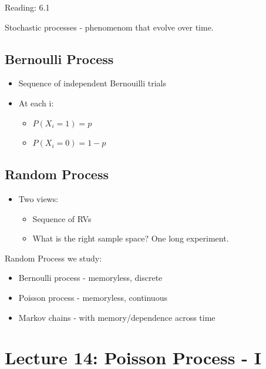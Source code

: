 \documentclass{article}
\begin{document}
 Reading: 6.1

Stochastic processes - phenomenom that evolve over time.


\subsection{Bernoulli Process}

\begin{itemize}
    \item Sequence of independent Bernouilli trials
    \item At each i:
    \begin{itemize}
        \item $P(X_i=1)=p$
        \item $P(X_i=0)=1-p$
    \end{itemize}
\end{itemize}

\subsection{Random Process}


\begin{itemize}
    \item Two views:
    \begin{itemize}
        \item Sequence of RVs
        \item What is the right sample space?  One long experiment.
    \end{itemize}
\end{itemize}


Random Process we study:
\begin{itemize}
    \item Bernoulli process - memoryless, discrete
    \item Poisson process - memoryless, continuous
     \item Markov chains - with memory/dependence across time
\end{itemize}


\section{Lecture 14: Poisson Process - I}
\end{document}
